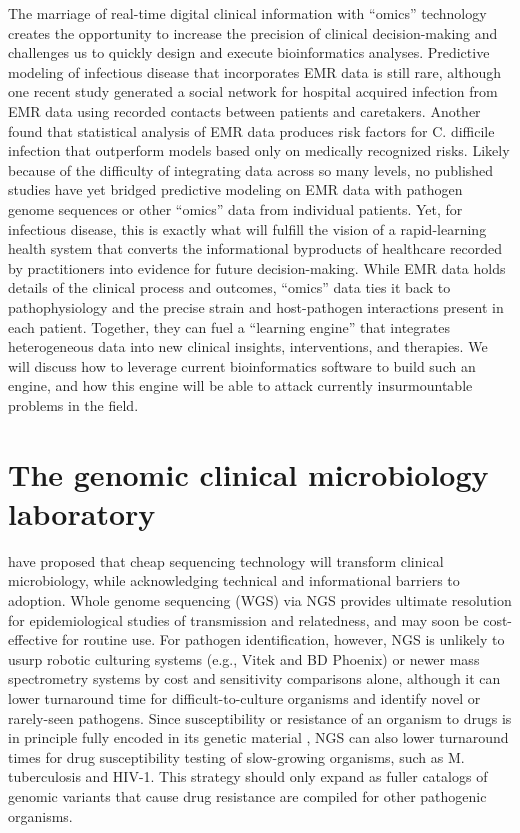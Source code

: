 The marriage of real-time digital clinical information with “omics” technology creates the opportunity to increase the precision of clinical decision-making and challenges us to quickly design and execute bioinformatics analyses. Predictive modeling of infectious disease that incorporates EMR data is still rare, although one recent study generated a social network for hospital acquired infection from EMR data using recorded contacts between patients and caretakers.\autocite{Cusumano-Towner2013} Another found that statistical analysis of EMR data produces risk factors for C. difficile infection that outperform models based only on medically recognized risks.\autocite{Wiens2014} Likely because of the difficulty of integrating data across so many levels, no published studies have yet bridged predictive modeling on EMR data with pathogen genome sequences or other “omics” data from individual patients. Yet, for infectious disease, this is exactly what will fulfill the vision of a rapid-learning health system \autocite{Care2014,Kohane2012} that converts the informational byproducts of healthcare recorded by practitioners into evidence for future decision-making. While EMR data holds details of the clinical process and outcomes, “omics” data ties it back to pathophysiology and the precise strain and host-pathogen interactions present in each patient. Together, they can fuel a “learning engine” that integrates heterogeneous data into new clinical insights, interventions, and therapies. We will discuss how to leverage current bioinformatics software to build such an engine, and how this engine will be able to attack currently insurmountable problems in the field.

\section{The genomic clinical microbiology laboratory}

\autocite{Didelot2012,Koser2012} have proposed that cheap sequencing technology will transform clinical microbiology, while acknowledging technical and informational barriers to adoption. Whole genome sequencing (WGS) via NGS provides ultimate resolution for epidemiological studies of transmission and relatedness, and may soon be cost-effective for routine use.\autocite{Didelot2012,Koser2012} For pathogen identification, however, NGS is unlikely to usurp robotic culturing systems (e.g., Vitek and BD Phoenix) or newer mass spectrometry systems by cost and sensitivity comparisons alone, although it can lower turnaround time for difficult-to-culture organisms and identify novel or rarely-seen pathogens.\autocite{Koser2012,Naccache2015} Since susceptibility or resistance of an organism to drugs is in principle fully encoded in its genetic material \autocite{Didelot2012,Gordon2014}, NGS can also lower turnaround times for drug susceptibility testing of slow-growing organisms, such as M. tuberculosis \autocite{Boehme2010} and HIV-1.\autocite{Ram2015} This strategy should only expand as fuller catalogs of genomic variants that cause drug resistance are compiled for other pathogenic organisms.

